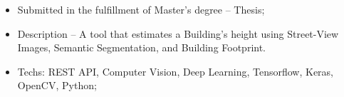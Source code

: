 \documentclass[10pt,a4paper]{altacv}
\begin{document}
\begin{itemize}
  \justifying
  \item Submitted in the fulfillment of Master's degree -- Thesis;
  \item Description -- A tool that estimates a Building's height using Street-View Images, Semantic Segmentation, and Building Footprint.
  \item Techs: REST API, Computer Vision, Deep Learning, Tensorflow, Keras, OpenCV, Python;
\end{itemize}

%

\medskip
\end{document}
